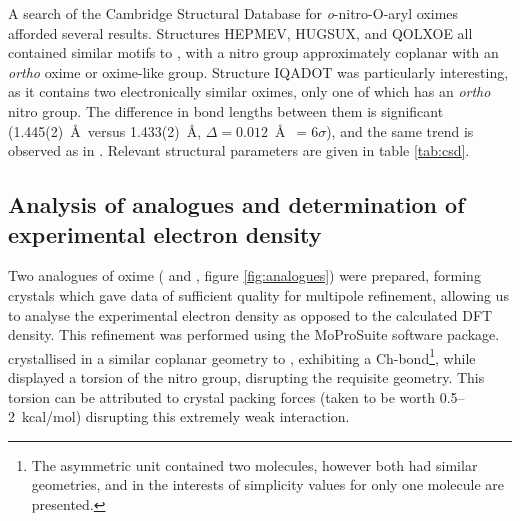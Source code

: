 \begin{refsection}
A search of the Cambridge Structural Database for \emph{o}-nitro-O-aryl oximes afforded several results.\autocite{CSD}
Structures HEPMEV, HUGSUX, and QOLXOE all contained similar motifs to , with a nitro group approximately coplanar with an \emph{ortho} oxime or oxime-like group.\autocite{Saavedra2001,Kostyanovsky2002,Saavedra2006a}
Structure IQADOT was particularly interesting, as it contains two electronically similar oximes, only one of which has an \emph{ortho} nitro group.\autocite{Renaudet2003}
The difference in bond lengths between them is significant (1.445(2)~\AA~versus 1.433(2)~\AA, $\Delta = 0.012$~\AA~$= 6\sigma$), and the same trend is observed as in .
Relevant structural parameters are given in table \ref{tab:csd}.

\subsection{Analysis of analogues and determination of experimental electron density}
Two analogues of oxime  ( and , figure \ref{fig:analogues}) were prepared, forming crystals which gave data of sufficient quality for multipole refinement, allowing us to analyse the experimental electron density as opposed to the calculated DFT density.\autocite{Hansen1978}
This refinement was performed using the MoProSuite software package.\autocite{Jelsch2005}
 crystallised in a similar coplanar geometry to , exhibiting a Ch-bond\footnote[1]{The asymmetric unit contained two molecules, however both had similar geometries, and in the interests of simplicity values for only one molecule are presented.}, while  displayed a torsion of the nitro group, disrupting the requisite geometry.
This torsion can be attributed to crystal packing forces (taken to be worth 0.5--2~kcal/mol) disrupting this extremely weak interaction.\autocite{Dunitz2009}


\end{refsection}
